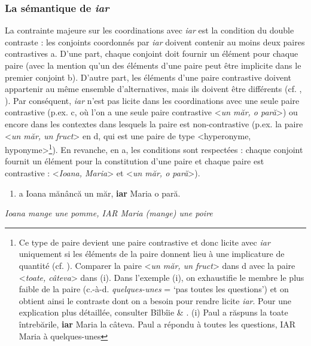 \subsubsection{La sémantique de \textit{iar}}
\label{bkm:Ref302038000}La contrainte majeure sur les coordinations avec \textit{iar} est la condition du double contraste : les conjoints coordonnés par \textit{iar} doivent contenir au moins deux paires contrastives a. D'une part, chaque conjoint doit fournir un élément pour chaque paire (avec la mention qu'un des éléments d'une paire peut être implicite dans le premier conjoint b). D'autre part, les éléments d'une paire contrastive doivent appartenir au même ensemble d'alternatives, mais ils doivent être différents (cf. \citet{Zeevat2004}, \citet{Umbach2005}). Par conséquent, \textit{iar} n'est pas licite dans les coordinations avec une seule paire contrastive (p.ex. c, où l'on a une seule paire contrastive {\textless}\textit{un măr, o pară}{\textgreater}) ou encore dans les contextes dans lesquels la paire est non-contrastive (p.ex. la paire {\textless}\textit{un măr, un fruct}{\textgreater} en d, qui est une paire de type {\textless}hyperonyme, hyponyme{\textgreater}\footnote{Ce type de paire devient une paire contrastive et donc licite avec \textit{iar} uniquement si les éléments de la paire donnent lieu à une implicature de quantité (cf. \citet{Geurts2010}). Comparer la paire {\textless}\textit{un măr, un fruct}{\textgreater} dans d avec la paire {\textless}\textit{toate, câteva}{\textgreater} dans (i). Dans l'exemple (i), on exhaustifie le membre le plus faible de la paire (c.-à-d. \textit{quelques-unes} = `pas toutes les questions') et on obtient ainsi le contraste dont on a besoin pour rendre licite \textit{iar}. Pour une explication plus détaillée, consulter Bîlbîie \& \citet{Winterstein2011}.
(i)  Paul a răspuns la toate întrebările, \textbf{iar} Maria la câteva.
  Paul a répondu à toutes les questions, IAR Maria à quelques-unes}). En revanche, en a, les conditions sont respectées : chaque conjoint fournit un élément pour la constitution d'une paire et chaque paire est contrastive : {\textless}\textit{Ioana, Maria}{\textgreater} et {\textless}\textit{un măr, o pară}{\textgreater}).~


\begin{enumerate}
\item \label{bkm:Ref302038976}a  Ioana mănâncă un măr, \textbf{iar} Maria o pară.


\end{enumerate}
{\itshape
Ioana mange une pomme, IAR Maria (mange) une poire}

